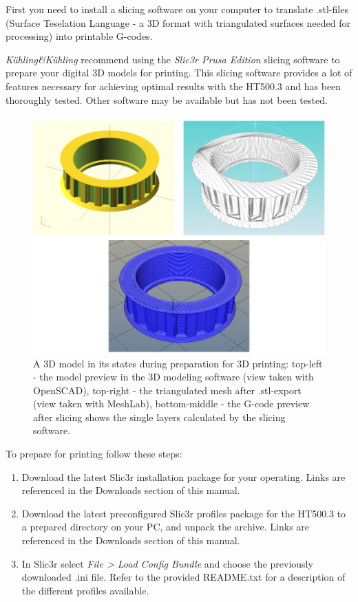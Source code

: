 First you need to install a slicing software on your computer to 
translate .stl-files (Surface Teselation Language - a 3D format with triangulated surfaces needed for processing) into printable G-codes.

\emph{Kühling\&Kühling} recommend using the \emph{Slic3r Prusa Edition} slicing software to prepare your digital 3D models for printing. This slicing software provides a lot of features necessary for achieving optimal results with the HT500.3 and has been thoroughly tested. Other software may be available but has not been tested.

\begin{figure}[H]
  \centering
  \includegraphics[width=.7\linewidth]{./img/opm_pulleyscadandsliced.png}
  \caption{A 3D model in its states during preparation for 3D printing: top-left - the 
           model preview in the 3D modeling software (view taken with OpenSCAD), top-right - the triangulated mesh after .stl-export (view taken with MeshLab), bottom-middle - the G-code preview after slicing shows the single layers calculated by the slicing software.}

\end{figure}

 To prepare for printing follow these steps:

\begin{enumerate}
  \item Download the latest Slic3r installation package for your operating. Links are referenced in the 
        Downloads section of this manual.
  \item Download the latest preconfigured Slic3r profiles package for the HT500.3 to a prepared directory on
        your PC, and unpack the archive. Links are referenced in the 
        Downloads section of this manual.
  \item In Slic3r select \emph{File > Load Config Bundle} and choose the previously downloaded 
        .ini file. Refer to the provided README.txt for a description of the different profiles available.
\end{enumerate}


